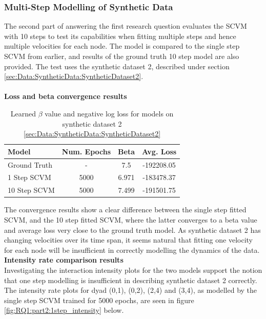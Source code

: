 \subsubsection{Multi-Step Modelling of Synthetic Data}
\label{sec:ResearchQuestion1:multiStepSynthetic}
The second part of answering the first research question evaluates the SCVM with 10 steps to test its capabilities when fitting multiple steps and hence multiple velocities for each node. 
The model is compared to the single step SCVM from earlier, and results of the ground truth 10 step model are also provided. 
The test uses the synthetic dataset 2, described under section \ref{sec:Data:SyntheticData:SyntheticDataset2}.
\\\\
\textbf{Loss and beta convergence results}

\begin{table}[H]
\centering
\begin{tabular}{|l|c|cc|}
\hline
Model         & \multicolumn{1}{l|}{Num. Epochs} & Beta & Avg. Loss \\ \hline
Ground Truth  & -                                & 7.5  & -192208.05 \\
1 Step SCVM & 5000                          & 6.971 &  -183478.37      \\
10 Step SCVM & 5000                          & 7.499   & -191501.75      \\ \hline
\end{tabular}
\caption{Learned $\beta$ value and negative log loss for models on synthetic dataset 2 \ref{sec:Data:SyntheticData:SyntheticDataset2}}
\label{tab:MultiStep1}
\end{table}
\noindent 
The convergence results show a clear difference between the single step fitted SCVM, and the 10 step fitted SCVM, where the latter converges to a beta value and average loss very close to the ground truth model.
As synthetic dataset 2 has changing velocities over its time span, it seems natural that fitting one velocity for each node will be insufficient in correctly modelling the dynamics of the data. 
\clearpage
\vspace*{-2cm}
\noindent
\textbf{Intensity rate comparison results}
\\
Investigating the interaction intensity plots for the two models support the notion that one step modelling is insufficient in describing synthetic dataset 2 correctly.
The intensity rate plots for dyad (0,1), (0,2), (2,4) and (3,4), as modelled by the single step SCVM trained for 5000 epochs, are seen in figure \ref{fig:RQ1:part2:1step_intensity} below.
